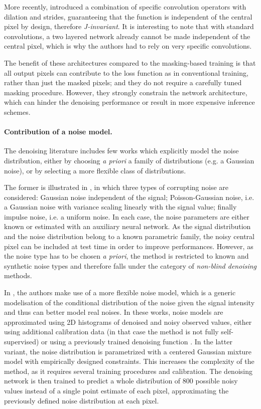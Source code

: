 \documentclass{article}
\begin{document}
More recently, \cite{lee2020noise2kernel} introduced a combination of specific convolution operators with dilation and strides, guaranteeing that the function is independent of the central pixel by design, therefore \textit{J-invariant}. It is interesting to note that with standard convolutions, a two layered network already cannot be made independent of the central pixel, which is why the authors had to rely on very specific convolutions.

The benefit of these architectures compared to the masking-based training is that all output pixels can contribute to the loss function as in conventional training, rather than just the masked pixels; and they do not require a carefully tuned masking procedure. However, they strongly constrain the network architecture, which can hinder the denoising performance or result in more expensive inference schemes.

\paragraph{Contribution of a noise model.}
The denoising literature includes few works which explicitly model the noise distribution, either by choosing \textit{a priori} a  family of distributions (e.g. a Gaussian noise), or by selecting a more flexible class of distributions.

The former is illustrated in \cite{laine2019high}, in which three types of corrupting noise are considered: Gaussian noise independent of the signal; Poisson-Gaussian noise, i.e. a Gaussian noise with variance scaling linearly with the signal value; finally impulse noise, i.e. a uniform noise. In each case, the noise parameters are either known or estimated with an auxiliary neural network. As the signal distribution and the noise distribution belong to a known parametric family, the noisy central pixel can be included at test time in order to improve performances. However, as the noise type has to be chosen \textit{a priori}, the method is restricted to known and synthetic noise types and therefore falls under the category of \textit{non-blind denoising} methods.

In \cite{krull2019probabilistic,prakash2020fully,2020DivNoising}, the authors make use of a more flexible noise model, which is a generic modelisation of the conditional distribution of the noise given the signal intensity and thus can better model real noises.
In these works, noise models are approximated using 2D histograms of denoised and noisy observed values, either using additional calibration data (in that case the method is not fully self-supervised) or using a previously trained denoising function \cite{prakash2020fully}.
In the latter variant, the noise distribution is parametrized with a centered Gaussian mixture model with empirically designed constraints.
This increases the complexity of the method, as it requires several training procedures and calibration.
The denoising network is then trained to predict a whole distribution of $800$ possible noisy values instead of a single point estimate of each pixel, approximating the previously defined noise distribution at each pixel.
\end{document}
